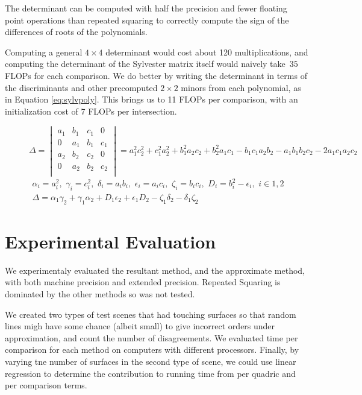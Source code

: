 \documentclass{cccg16}
\begin{document}
The determinant can be computed with half the precision and fewer
floating point operations than repeated squaring to correctly compute
the sign of the differences of roots of the polynomials.

Computing a general $4\times 4$ determinant would cost about 120
multiplications, and computing the determinant of the Sylvester matrix
itself would naively take~$35$ FLOPs for each comparison.  We do better by writing
the determinant in terms of the discriminants and other
precomputed $2\times 2$ minors from each polynomial, as in Equation
\ref{eq:sylvpoly}.  This brings us to 11 FLOPs per comparison, with an
initialization cost of 7 FLOPs per intersection.

\begin{figure}
  \begin{equation*}
    \Delta=\begin{vmatrix}
    a_1 & b_1 & c_1 & 0\\
    0 & a_1 & b_1 & c_1\\
    a_2 & b_2 & c_2 & 0\\
    0 & a_2 & b_2 & c_2\\
    \end{vmatrix}=
    a_1^2 c_2^2 + c_1^2 a_2^2 + b_1^2 a_2 c_2 + b_2^2 a_1 c_1 -
    b_1 c_1 a_2 b_2 - a_1 b_1 b_2 c_2 - 2 a_1 c_1 a_2 c_2
  \end{equation*}
  \begin{align}
    \alpha_i=a_i^2,\,\, \gamma_i=c_i^2,\,\,
    \delta_i=a_i b_i,\,\, \epsilon_i=a_i c_i,\,\, \zeta_i=b_i c_i,\,\,
    D_i=b_i^2-\epsilon_i,\,\,
    i\in {1, 2}\\
    \Delta = \alpha_1 \gamma_2 + \gamma_1 \alpha_2 +
    D_1 \epsilon_2 + \epsilon_1 D_2 - \zeta_1 \delta_2 -
    \delta_1 \zeta_2
  \label{eq:sylvpoly}
  \end{align}
\end{figure}

\section{Experimental Evaluation}
We experimentaly evaluated  the resultant method, and the  approximate method, with both machine
precision and extended precision.  Repeated Squaring is dominated by the other methods so was not tested.

We created two types of test scenes that had touching surfaces so that
random lines migh have some chance (albeit small) to give incorrect
orders under approximation, and count the number of disagreements.  We
evaluated time per comparison for each method on computers with
different processors.  Finally, by varying tne number of surfaces in
the second type of scene, we could use linear regression to determine
the contribution to running time from per quadric and per comparison
terms.
 
\end{document}
